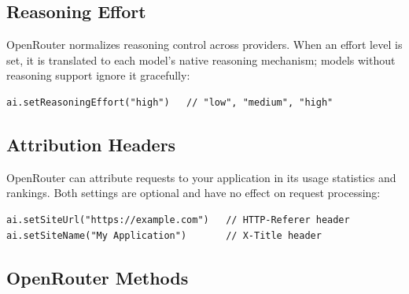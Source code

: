 \subsection{Reasoning Effort}

OpenRouter normalizes reasoning control across providers.  When an effort level is set, it is translated to each model's native reasoning mechanism; models without reasoning support ignore it gracefully:

\begin{lstlisting}[style=groovy]
ai.setReasoningEffort("high")   // "low", "medium", "high"
\end{lstlisting}

\subsection{Attribution Headers}

OpenRouter can attribute requests to your application in its usage statistics and rankings.  Both settings are optional and have no effect on request processing:

\begin{lstlisting}[style=groovy]
ai.setSiteUrl("https://example.com")   // HTTP-Referer header
ai.setSiteName("My Application")       // X-Title header
\end{lstlisting}

\subsection{OpenRouter Methods}

